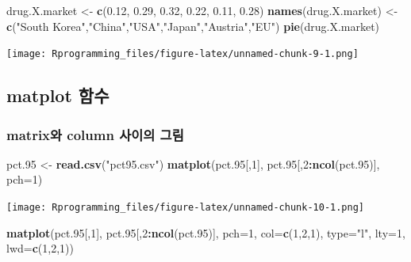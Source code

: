 \documentclass[10pt,]{krantz}
\makeatletter
\newenvironment{Shaded}{\begin{snugshade}}{\end{snugshade}}
\newcommand{\KeywordTok}[1]{\textcolor[rgb]{0.13,0.29,0.53}{\textbf{#1}}}
\newcommand{\DataTypeTok}[1]{\textcolor[rgb]{0.13,0.29,0.53}{#1}}
\newcommand{\DecValTok}[1]{\textcolor[rgb]{0.00,0.00,0.81}{#1}}
\newcommand{\FloatTok}[1]{\textcolor[rgb]{0.00,0.00,0.81}{#1}}
\newcommand{\StringTok}[1]{\textcolor[rgb]{0.31,0.60,0.02}{#1}}
\newcommand{\OperatorTok}[1]{\textcolor[rgb]{0.81,0.36,0.00}{\textbf{#1}}}
\newcommand{\NormalTok}[1]{#1}
\newenvironment{kframe}{%
\medskip{}
\setlength{\fboxsep}{.8em}
 \def\at@end@of@kframe{}%
 \ifinner\ifhmode%
  \def\at@end@of@kframe{\end{minipage}}%
  \begin{minipage}{\columnwidth}%
 \fi\fi%
 \def\FrameCommand##1{\hskip\@totalleftmargin \hskip-\fboxsep
 \colorbox{shadecolor}{##1}\hskip-\fboxsep
     \hskip-\linewidth \hskip-\@totalleftmargin \hskip\columnwidth}%
 \MakeFramed {\advance\hsize-\width
   \@totalleftmargin\z@ \linewidth\hsize
   \@setminipage}}%
 {\par\unskip\endMakeFramed%
 \at@end@of@kframe}
\renewenvironment{Shaded}{\begin{kframe}}{\end{kframe}}
\theoremstyle{definition}
\theoremstyle{definition}
\theoremstyle{remark}
\makeatother
\begin{document}
\begin{Shaded}
\begin{Highlighting}[]
\NormalTok{drug.X.market <-}\StringTok{ }\KeywordTok{c}\NormalTok{(}\FloatTok{0.12}\NormalTok{, }\FloatTok{0.29}\NormalTok{, }\FloatTok{0.32}\NormalTok{, }\FloatTok{0.22}\NormalTok{, }\FloatTok{0.11}\NormalTok{, }\FloatTok{0.28}\NormalTok{)}
\KeywordTok{names}\NormalTok{(drug.X.market) <-}\StringTok{ }\KeywordTok{c}\NormalTok{(}\StringTok{"South Korea"}\NormalTok{,}\StringTok{"China"}\NormalTok{,}\StringTok{"USA"}\NormalTok{,}\StringTok{"Japan"}\NormalTok{,}\StringTok{"Austria"}\NormalTok{,}\StringTok{"EU"}\NormalTok{)}
\KeywordTok{pie}\NormalTok{(drug.X.market)}
\end{Highlighting}
\end{Shaded}

\texttt{[image: Rprogramming\_files/figure-latex/unnamed-chunk-9-1.png]}

\subsection{matplot 함수}\label{matplot-}

\subsubsection{matrix와 column 사이의 그림}\label{matrix-column--}

\begin{Shaded}
\begin{Highlighting}[]
\NormalTok{pct.}\DecValTok{95}\NormalTok{ <-}\StringTok{ }\KeywordTok{read.csv}\NormalTok{(}\StringTok{"pct95.csv"}\NormalTok{)}
\KeywordTok{matplot}\NormalTok{(pct.}\DecValTok{95}\NormalTok{[,}\DecValTok{1}\NormalTok{], pct.}\DecValTok{95}\NormalTok{[,}\DecValTok{2}\OperatorTok{:}\KeywordTok{ncol}\NormalTok{(pct.}\DecValTok{95}\NormalTok{)], }\DataTypeTok{pch=}\DecValTok{1}\NormalTok{)}
\end{Highlighting}
\end{Shaded}

\texttt{[image: Rprogramming\_files/figure-latex/unnamed-chunk-10-1.png]}

\begin{Shaded}
\begin{Highlighting}[]

\KeywordTok{matplot}\NormalTok{(pct.}\DecValTok{95}\NormalTok{[,}\DecValTok{1}\NormalTok{], pct.}\DecValTok{95}\NormalTok{[,}\DecValTok{2}\OperatorTok{:}\KeywordTok{ncol}\NormalTok{(pct.}\DecValTok{95}\NormalTok{)], }\DataTypeTok{pch=}\DecValTok{1}\NormalTok{, }\DataTypeTok{col=}\KeywordTok{c}\NormalTok{(}\DecValTok{1}\NormalTok{,}\DecValTok{2}\NormalTok{,}\DecValTok{1}\NormalTok{), }\DataTypeTok{type=}\StringTok{"l"}\NormalTok{, }\DataTypeTok{lty=}\DecValTok{1}\NormalTok{, }\DataTypeTok{lwd=}\KeywordTok{c}\NormalTok{(}\DecValTok{1}\NormalTok{,}\DecValTok{2}\NormalTok{,}\DecValTok{1}\NormalTok{))}
\end{Highlighting}
\end{Shaded}
\end{document}
